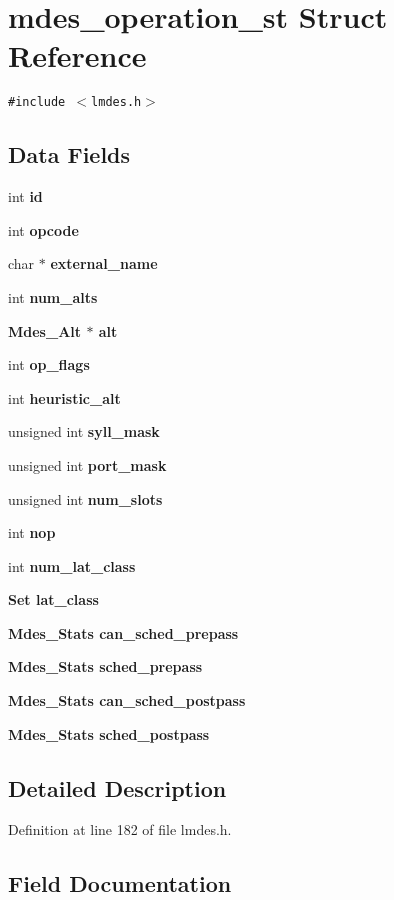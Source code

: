 \section{mdes\_\-operation\_\-st Struct Reference}
\label{structmdes__operation__st}
{\tt \#include $<$lmdes.h$>$}

\subsection*{Data Fields}
\begin{CompactItemize}
\item 
int \bf{id}
\item 
int \bf{opcode}
\item 
char $\ast$ \bf{external\_\-name}
\item 
int \bf{num\_\-alts}
\item 
\bf{Mdes\_\-Alt} $\ast$ \bf{alt}
\item 
int \bf{op\_\-flags}
\item 
int \bf{heuristic\_\-alt}
\item 
unsigned int \bf{syll\_\-mask}
\item 
unsigned int \bf{port\_\-mask}
\item 
unsigned int \bf{num\_\-slots}
\item 
int \bf{nop}
\item 
int \bf{num\_\-lat\_\-class}
\item 
\bf{Set} \bf{lat\_\-class}
\item 
\bf{Mdes\_\-Stats} \bf{can\_\-sched\_\-prepass}
\item 
\bf{Mdes\_\-Stats} \bf{sched\_\-prepass}
\item 
\bf{Mdes\_\-Stats} \bf{can\_\-sched\_\-postpass}
\item 
\bf{Mdes\_\-Stats} \bf{sched\_\-postpass}
\end{CompactItemize}


\subsection{Detailed Description}




Definition at line 182 of file lmdes.h.

\subsection{Field Documentation}
